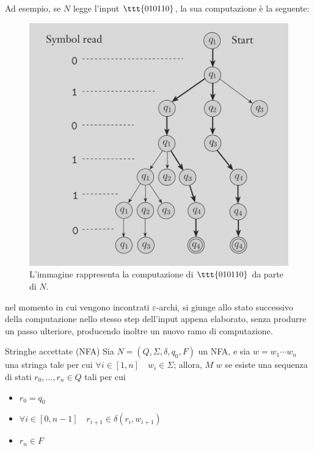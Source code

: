 \documentclass[a4paper, 12pt]{report}
\begin{document}
\begin{example}[NFA]
        Ad esempio, se $N$ legge l'input $\ttt{010110}$, la sua computazione è la seguente:

        \begin{figure}[H]
            \centering
            \includegraphics[scale=0.35]{../assets/nfa-neg.png}
            \caption{L'immagine rappresenta la computazione di $\ttt{010110}$ da parte di $N$.}
        \end{figure}

         nel momento in cui vengono incontrati $\varepsilon$-archi, si giunge allo stato successivo della computazione nello stesso step dell'input appena elaborato, senza produrre un passo ulteriore, producendo inoltre un nuovo ramo di computazione.
    \end{example}

    \begin{frameddefn}{Stringhe accettate (NFA)}
        Sia $N = (Q, \Sigma, \delta, q_0, F)$ un NFA, e sia $w = w_1\cdots w_n$ una stringa tale per cui $\forall i \in [1, n] \quad w_i \in \Sigma$; allora, $M$  $w$ se esiste una sequenza di stati $r_0, \ldots, r_n \in Q$ tali per cui

        \begin{itemize}
            \item $r_0 = q_0$
            \item $\forall i \in [0, n - 1] \quad r_{i + 1} \in \delta(r_i, w_{i + 1})$
            \item $r_n \in F$
        \end{itemize}
    \end{frameddefn}
\end{document}
